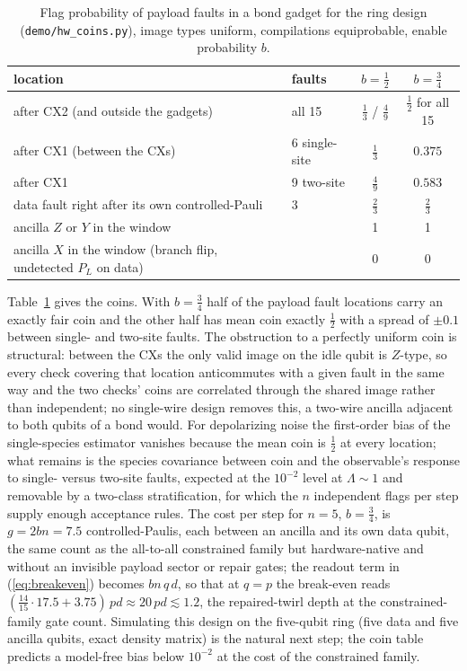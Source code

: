 \documentclass[11pt,a4paper]{article}
\theoremstyle{remark}
\begin{document}
\begin{table}[h]
\centering\small
\caption{Flag probability of payload faults in a bond gadget for the ring design (\texttt{demo/hw\_coins.py}), image types uniform, compilations equiprobable, enable probability $b$.}
\label{tab:hw-coins}
\begin{tabular}{llcc}
\toprule
location & faults & $b=\tfrac12$ & $b=\tfrac34$ \\
\midrule
after CX2 (and outside the gadgets) & all 15 & $\tfrac13$ / $\tfrac49$ & $\tfrac12$ for all 15 \\
after CX1 (between the CXs) & 6 single-site & $\tfrac13$ & $0.375$ \\
after CX1 & 9 two-site & $\tfrac49$ & $0.583$ \\
data fault right after its own controlled-Pauli & 3 & $\tfrac23$ & $\tfrac23$ \\
ancilla $Z$ or $Y$ in the window & & 1 & 1 \\
ancilla $X$ in the window (branch flip, undetected $P_L$ on data) & & 0 & 0 \\
\bottomrule
\end{tabular}
\end{table}

Table~\ref{tab:hw-coins} gives the coins. With $b=\tfrac34$ half of the payload fault locations carry an exactly fair coin and the other half has mean coin exactly $\tfrac12$ with a spread of $\pm0.1$ between single- and two-site faults. The obstruction to a perfectly uniform coin is structural: between the CXs the only valid image on the idle qubit is $Z$-type, so every check covering that location anticommutes with a given fault in the same way and the two checks' coins are correlated through the shared image rather than independent; no single-wire design removes this, a two-wire ancilla adjacent to both qubits of a bond would. For depolarizing noise the first-order bias of the single-species estimator vanishes because the mean coin is $\tfrac12$ at every location; what remains is the species covariance between coin and the observable's response to single- versus two-site faults, expected at the $10^{-2}$ level at $\Lambda\sim1$ and removable by a two-class stratification, for which the $n$ independent flags per step supply enough acceptance rules. The cost per step for $n=5$, $b=\tfrac34$, is $g=2bn=7.5$ controlled-Paulis, each between an ancilla and its own data qubit, the same count as the all-to-all constrained family but hardware-native and without an invisible payload sector or repair gates; the readout term in (\ref{eq:breakeven}) becomes $bn\,q\,d$, so that at $q=p$ the break-even reads $(\tfrac{14}{15}\cdot17.5+3.75)\,pd\approx20\,pd\lesssim1.2$, the repaired-twirl depth at the constrained-family gate count. Simulating this design on the five-qubit ring (five data and five ancilla qubits, exact density matrix) is the natural next step; the coin table predicts a model-free bias below $10^{-2}$ at the cost of the constrained family.
\end{document}
